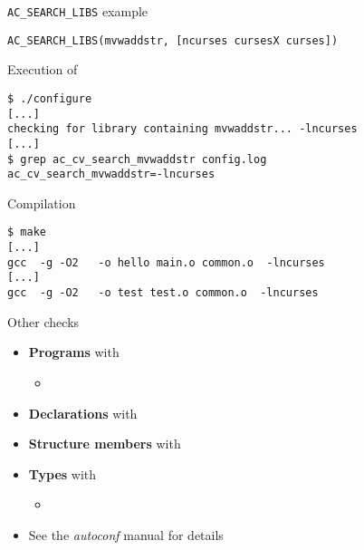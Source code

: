 \begin{frame}[fragile]{{\tt AC\_SEARCH\_LIBS} example}

\begin{block}{}
\begin{verbatim}
AC_SEARCH_LIBS(mvwaddstr, [ncurses cursesX curses])
\end{verbatim}
\end{block}

\begin{block}{Execution of }
\begin{verbatim}
$ ./configure
[...]
checking for library containing mvwaddstr... -lncurses
[...]
$ grep ac_cv_search_mvwaddstr config.log
ac_cv_search_mvwaddstr=-lncurses
\end{verbatim}
\end{block}

\begin{block}{Compilation}
\begin{verbatim}
$ make
[...]
gcc  -g -O2   -o hello main.o common.o  -lncurses
[...]
gcc  -g -O2   -o test test.o common.o  -lncurses
\end{verbatim}
\end{block}

\end{frame}

\begin{frame}{Other checks}
  \begin{itemize}
  \item {\bf Programs} with 
    \begin{itemize}
    \item {}
    \end{itemize}
  \item {\bf Declarations} with 
  \item {\bf Structure members} with 
  \item {\bf Types} with 
    \begin{itemize}
    \item {}
    \end{itemize}
  \item See the {\em autoconf} manual for details
  \end{itemize}
\end{frame}


